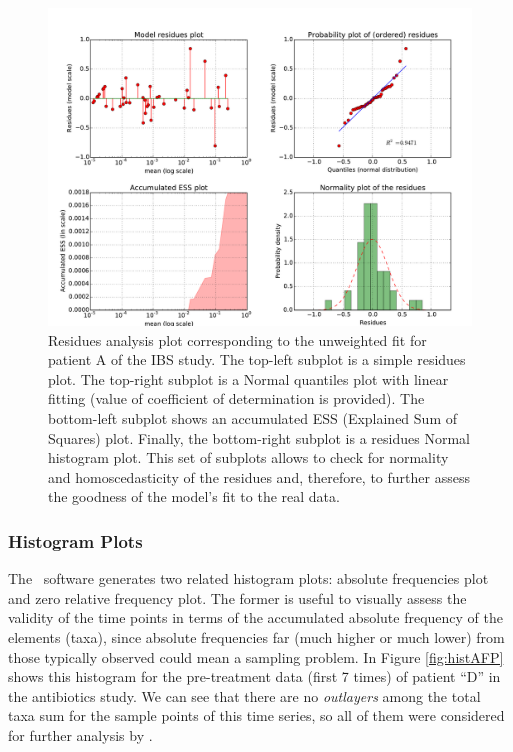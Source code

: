 \begin{figure}
	\centering
	\includegraphics[width=\textwidth]{results/fits/IBS_h_A_amplicons_family_stdVSmean_LLR_RES.pdf}
	\caption{Residues analysis plot corresponding to the unweighted fit for patient A of the IBS study\cite{IBS}. The top-left subplot is a simple residues plot. The top-right subplot is a Normal quantiles plot with linear fitting (value of coefficient of determination is provided). The bottom-left subplot shows an accumulated ESS (Explained Sum of Squares) plot. Finally, the bottom-right subplot is a residues Normal histogram plot. This set of subplots allows to check for normality and homoscedasticity of the residues and, therefore, to further assess the goodness of the model's fit to the real data.}
	\label{fig:unwRes}
\end{figure}

\subsubsection*{Histogram Plots} 
The \CC\ software generates two related histogram plots: absolute frequencies plot and zero relative frequency plot. The former is useful to visually assess the validity of the time points in terms of the accumulated absolute frequency of the elements (taxa), since absolute frequencies far (much higher or much lower) from those typically observed could mean a sampling problem. In Figure \ref{fig:histAFP} shows this histogram for the pre-treatment data (first 7 times) of patient ``D'' in the antibiotics study\cite{antibiotic}. We can see that there are no \emph{outlayers} among the total taxa sum for the sample points of this time series, so all of them were considered for further analysis by \CC.


